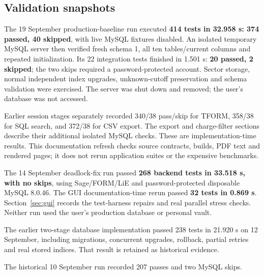 \documentclass[11pt,a4paper]{article}
\numberwithin{equation}{section}
\begin{document}
\subsection{Validation snapshots}
The 19 September production-baseline run executed \textbf{414 tests in
32.958 s: 374 passed, 40 skipped}, with live MySQL fixtures disabled.
An isolated temporary MySQL server then verified fresh schema 1, all ten
tables/current columns and repeated initialization. Its 22 integration tests
finished in 1.501 s: \textbf{20 passed, 2 skipped}; the two skips required a
password-protected account. Sector storage, normal independent index upgrades,
unknown-cutoff preservation and schema validation were exercised. The server
was shut down and removed; the user's database was not accessed.

Earlier session stages separately recorded 340/38 pass/skip for TFORM,
358/38 for SQL search, and 372/38 for CSV export. The export and charge-filter
sections describe their additional isolated MySQL checks.
These are implementation-time results. This documentation refresh checks
source contracts, builds, PDF text and rendered pages; it does not rerun
application suites or the expensive benchmarks.

The 14 September deadlock-fix run passed \textbf{268 backend tests in 33.518 s,
with no skips}, using Sage/FORM/LiE and password-protected disposable MySQL
8.0.46. The GUI documentation-time rerun passed \textbf{32 tests in 0.869 s}.
Section~\ref{sec:gui} records the test-harness repairs and real parallel stress
checks. Neither run used the user's production database or personal vault.

The earlier two-stage database implementation passed 238 tests in 21.920 s on
12 September, including migrations, concurrent upgrades, rollback, partial
retries and real stored indices. That result is retained as historical evidence.

The historical 10 September run recorded 207 passes and two MySQL skips.

\clearpage
\end{document}
